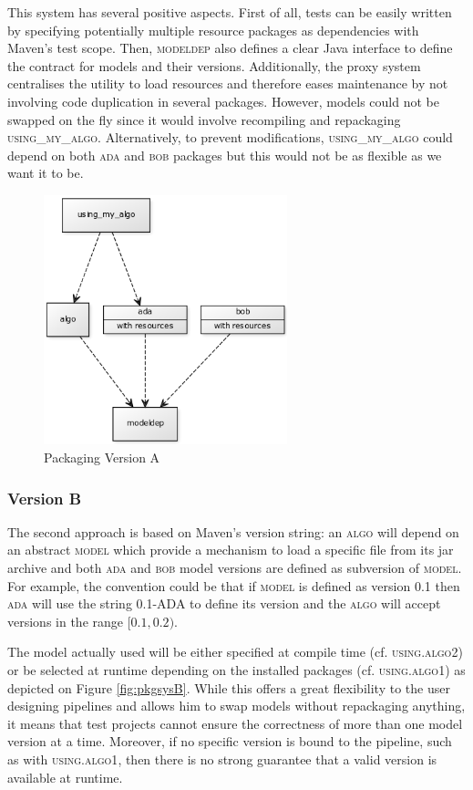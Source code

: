 \documentclass{article}
\newcommand{\ID}[1]{{\textsc{#1}}}
\begin{document}
This system has several positive aspects. First of all, tests can be easily written by specifying potentially multiple resource packages as dependencies with Maven's test scope. Then, \ID{modeldep} also defines a clear Java interface to define the contract for models and their versions. Additionally, the proxy system centralises the utility to load resources and therefore eases maintenance by not involving code duplication in several packages. However, models could not be swapped on the fly since it would involve recompiling and repackaging \ID{using\_my\_algo}.  Alternatively, to prevent modifications, \ID{using\_my\_algo} could depend on both \ID{ada} and \ID{bob} packages but this would not be as flexible as we want it to be.

\begin{figure}
\centering
\includegraphics[width=200pt]{res/packaging_version_A.png}
\caption{Packaging Version A}
\label{fig:pkgsysA}
\end{figure}


\subsubsection{Version B}

The second approach is based on Maven's version string: an \ID{algo} will depend on an abstract \ID{model} which provide a mechanism to load a specific file from its jar archive and both \ID{ada} and \ID{bob} model versions are defined as subversion of \ID{model}. For example, the convention could be that if \ID{model} is defined as version \ID{0.1} then \ID{ada} will use the string \ID{0.1-ADA} to define its version and the \ID{algo} will accept versions in the range $ [0.1,0.2) $.

The model actually used will be either specified at compile time (cf. \ID{using.algo2}) or be selected at runtime depending on the installed packages (cf. \ID{using.algo1}) as depicted on Figure \ref{fig:pkgsysB}. While this offers a great flexibility to the user designing pipelines and allows him to swap models without repackaging anything, it means that test projects cannot ensure the correctness of more than one model version at a time. Moreover, if no specific version is bound to the pipeline, such as with \ID{using.algo1}, then there is no strong guarantee that a valid version is available at runtime.
\end{document}
